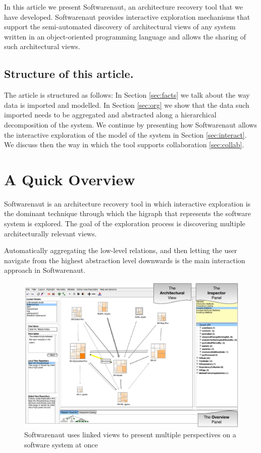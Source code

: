 \documentclass[preprint,12pt]{elsarticle}
\begin{document}
In this article we present Softwarenaut, an architecture recovery tool that we have developed. Softwarenaut provides interactive exploration mechanisms that support the semi-automated discovery of architectural views of any system written in an object-oriented programming language and allows the sharing of such architectural views. 

\subsection*{Structure of this article.} The article is structured as follows: In Section \ref{sec:facts} we talk about the way data is imported and modelled. In Section \ref{sec:org} we show that the data such imported needs to be aggregated and abstracted along a hierarchical decomposition of the system. We continue by presenting how Softwarenaut allows the interactive exploration of the model of the system in Section \ref{sec:interact}. We discuss then the way in which the tool supports collaboration \ref{sec:collab}. %



\section {A Quick Overview}
\label{sec:over}

Softwarenaut is an architecture recovery tool in which interactive exploration is the dominant technique through which the higraph that represents the software system is explored. The goal of the exploration process is discovering multiple architecturally relevant views. 

Automatically aggregating the low-level relations, and then letting the user navigate from the highest abstraction level downwards is the main interaction approach in Softwarenaut. 

\begin{figure}[h]
\begin{center}
\includegraphics[width=0.8\linewidth]{images/SnautOnSnaut}
\caption{Softwarenaut uses linked views to present multiple perspectives on a software system at once}
\end{center}
\end{figure}
\end{document}

